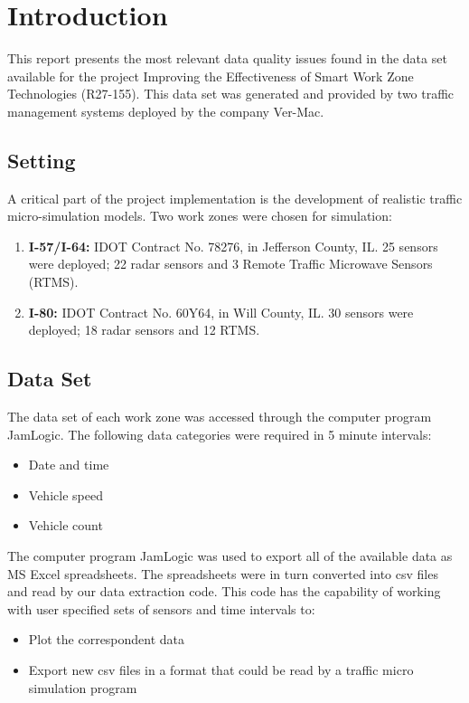 \documentclass[11pt]{article}
\begin{document}
\section{Introduction}
This report presents the most relevant data quality issues found in the data set available for the project Improving the Effectiveness of Smart Work Zone Technologies (R27-155). This data set was generated and provided by two traffic management systems deployed by the company Ver-Mac.

\subsection{Setting}
A critical part of the project implementation is the development of realistic traffic micro-simulation models. Two work zones were chosen for simulation:
\begin{enumerate}
	\item \textbf{I-57/I-64:} IDOT Contract No. 78276, in Jefferson County, IL. 25 sensors were deployed; 22 radar sensors and 3 Remote Traffic Microwave Sensors (RTMS).
	\item \textbf{I-80:} IDOT Contract No. 60Y64, in Will County, IL. 30 sensors were deployed; 18 radar sensors and 12 RTMS. 
\end{enumerate}

\subsection{Data Set}
The data set of each work zone was accessed through the computer program JamLogic. The following data categories were required in 5 minute intervals:
\begin{itemize}
	\item Date and time
	\item Vehicle speed
	\item Vehicle count
\end{itemize}
The computer program JamLogic was used to export all of the available data as MS Excel spreadsheets. The spreadsheets were in turn converted into csv files and read by our data extraction code. This code has the capability of working with user specified sets of sensors and time intervals to:
\begin{itemize}
	\item Plot the correspondent data
	\item Export new csv files in a format that could be read by a traffic micro simulation program
\end{itemize}
 
\end{document}
